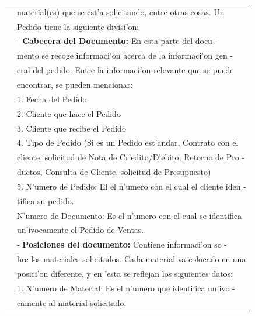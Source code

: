 \begin{table}[H]
\begin{tabular}{|l|l|}
                                                            & material(es) que se est'a solicitando, entre otras cosas. Un \\
                                                            & Pedido tiene la siguiente divisi'on: \\
                                                            & - \textbf{Cabecera del Documento:} En esta parte del docu -\\
                                                            & mento se recoge informaci'on acerca de la informaci'on gen -\\
                                                            & eral del pedido. Entre la informaci'on relevante que se puede \\
                                                            & encontrar, se pueden mencionar: \\
                                                            & 1. Fecha del Pedido \\
															  & 2. Cliente que hace el Pedido \\
															  & 3. Cliente que recibe el Pedido \\
															  & 4. Tipo de Pedido (Si es un Pedido est'andar, Contrato con el \\
															  & cliente, solicitud de Nota de Cr'edito/D'ebito, Retorno de Pro -\\
															  & ductos, Consulta de Cliente, solicitud de Presupuesto) \\
															 & 5. N'umero de Pedido: El el n'umero con el cual el cliente iden -\\
															 & tifica su pedido. \\
															 & N'umero de Documento: Es el n'umero con el cual se identifica\\
															 & un'ivocamente el Pedido de Ventas.\\
															 & - \textbf{Posiciones del documento:} Contiene informaci'on so -\\
															 & bre los materiales solicitados. Cada material va colocado en una \\
															 & posici'on diferente, y en 'esta se reflejan los siguientes datos:\\
															 & 1. N'umero de Material: Es el n'umero que identifica un'ivo -\\
															 & camente al material solicitado. \\

\end{tabular}
\end{table}
